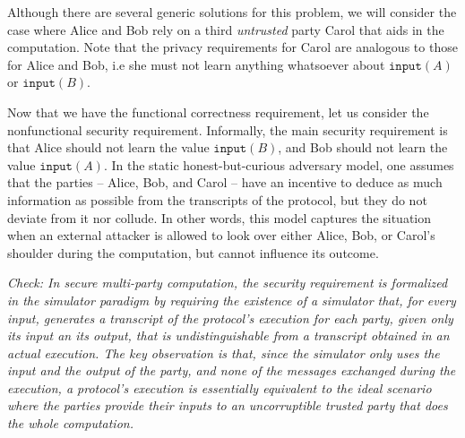 \documentclass[preprint]{sig-alternate-05-2015}
\begin{document}
Although there are several generic solutions for this problem,
we will consider the case where Alice and Bob rely on a third
{\em untrusted} party Carol that aids in the computation.
Note that the privacy requirements for Carol are analogous
to those for Alice and Bob, i.e she must not learn anything 
whatsoever about $\mathtt{input}(A)$ or $\mathtt{input}(B)$.




Now that we have the functional correctness requirement, let us consider
the nonfunctional security requirement.
Informally, the main security requirement is that 
Alice should not learn the value $\mathtt{input}(B)$,
and Bob should not learn the value $\mathtt{input}(A)$.
In the static honest-but-curious adversary model, one assumes that 
the parties -- Alice, Bob, and Carol -- have an incentive to 
deduce as much information as possible from the transcripts
of the protocol, but they do not deviate from it nor collude.
In other words, this model captures the situation when 
an external attacker is allowed to look over
either Alice, Bob, or Carol's shoulder during the computation, 
but cannot influence its outcome.

{\em{Check: In secure multi-party computation, the security requirement is formalized
in the simulator paradigm by requiring the existence 
of a simulator that, for every input, generates a transcript of the protocol's execution 
for each party,
given only its input an its output,
that is undistinguishable from a transcript obtained in an actual execution.
The key observation is that, since the simulator only uses the 
input and the output of the party, and none of the 
messages exchanged during the execution, 
a protocol's execution is essentially equivalent
to the ideal scenario where the parties provide their 
inputs to an uncorruptible trusted party that does the whole computation.}}
\end{document}
